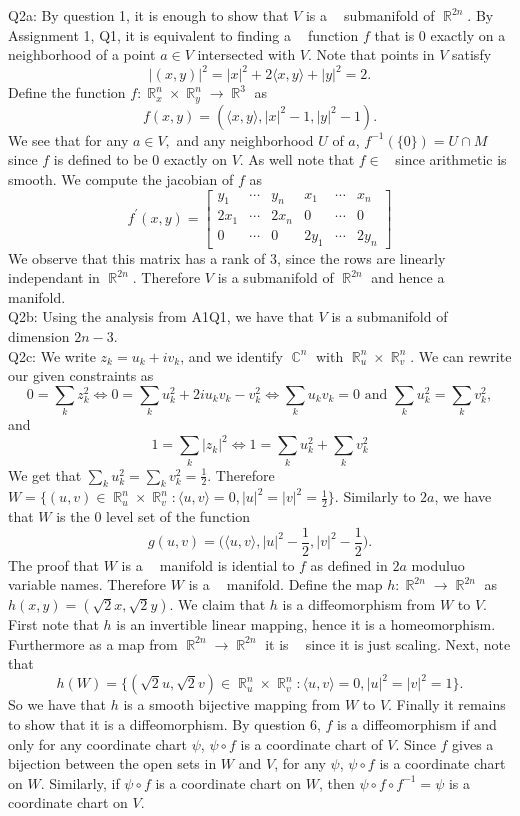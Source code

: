 \documentclass[letterpaper]{article}
\DeclareMathOperator{\smooth}{\mathcal{C}^\infty}
\DeclareMathOperator{\R}{\mathbb{R}}
\DeclareMathOperator{\C}{\mathbb{C}}
\newcommand{\lan}{\langle}
\newcommand{\ran}{\rangle}
\newcommand{\inn}[1]{\lan#1\ran}
\begin{document}
 
\noindent Q2a: By question 1, it is enough to show that $V$ is a $\smooth$ submanifold of $\R^{2n}$.
By Assignment 1, Q1, it is equivalent to finding a $\smooth$ function $f$ that is $0$ exactly on a neighborhood of a point $a\in V$ intersected with $V$.  
Note that points in $V$ satisfy $$|(x,y)|^2 = |x|^2 + 2\inn{x,y} + |y|^2 = 2.$$
Define the function $f: \R_x^n \times \R^n_y \to \R^3$ as $$f(x,y) = (\inn{x,y}, |x|^2-1, |y|^2-1).$$ 
We see that for any $a\in V,$ and any neighborhood $U$ of $a$, $f^{-1}(\{0\}) = U \cap M$ 
since $f$ is defined to be $0$ exactly on $V$. As well note that $f\in \smooth$ since arithmetic is smooth. 
We compute the jacobian of $f$ as 
$$f^\prime (x,y)= \begin{bmatrix}
    y_1 & \cdots & y_n & x_1 & \cdots & x_n 
    \\ 2x_1 & \cdots & 2x_n & 0 & \cdots & 0
    \\ 0 & \cdots & 0 & 2y_1 &\cdots & 2y_n 
\end{bmatrix} $$ We observe that this matrix has a rank of $3$, since the rows are linearly independant in $\R^{2n}$.
Therefore $V$ is a submanifold of $\R^{2n}$ and hence a $\smooth$ manifold. 
\newline \\ Q2b: Using the analysis from A1Q1, we have that $V$ is a submanifold of dimension $2n-3$. 
\newline \\ Q2c: We write $z_k = u_k + iv_k$, and we identify $\C^n $ with $\R_u^{n} \times \R^{n}_v$.
We can rewrite our given constraints as $$ 0=  \sum_k z_k^2 \iff 0 = \sum_{k} u_k^2 + 2iu_k v_k -v_k^2 \iff \sum_k u_kv_k =0 \text{ and } \sum_{k}u_k^2 = \sum_k v_k^2, $$ 
and $$1= \sum_{k} |z_k|^2 \iff 1 = \sum_k u_k^2 + \sum_k v_k^2 $$ 
We get that $\sum_k u_k^2 = \sum_{k} v_k^2 = \frac{1}{2}$. Therefore $W = \{(u,v) \in \R_u^{n} \times \R_v^n: \inn{u,v} = 0, |u|^2 = |v|^2 = \frac{1}{2}  \}.$ 
Similarly to $2a$, we have that $W$ is the $0$ level set of the function $$g(u,v) = \Big(\inn{u,v}, |u|^2 - \frac{1}{2}, |v|^2 - \frac{1}{2} \Big).$$
The proof that $W$ is a $\smooth$ manifold is idential to $f$ as defined in $2a$ moduluo variable names. 
Therefore $W$ is a $\smooth$ manifold. Define the map $h:\R^{2n} \to \R^{2n} $ as $h(x,y) = (\sqrt{2}x, \sqrt{2}y)$. 
We claim that $h$ is a diffeomorphism from $W$ to $V$. First note that $h$ is an invertible linear mapping, hence it is a homeomorphism. 
Furthermore as a map from $\R^{2n} \to \R^{2n}$ it is $\smooth$ since it is just scaling. 
Next, note that $$h(W) = \{(\sqrt{2}u,\sqrt{2}v) \in \R_u^{n} \times \R_v^{n} : \inn{u,v}= 0, |u|^2= |v|^2 =1\}.$$ 
So we have that $h$ is a smooth bijective mapping from $W$ to $V$. Finally it remains to show that it is a diffeomorphism.
By question $6$, $f$ is a diffeomorphism if and only for any coordinate chart $\psi$, $\psi\circ f$ is a coordinate chart of $V$. 
Since $f$ gives a bijection between the open sets in $W$ and $V$, for any $\psi$, $\psi\circ f$ is a coordinate chart on $W$. Similarly, if $\psi \circ f$ is a coordinate chart on $W$, 
then $\psi \circ f \circ f^{-1} = \psi$ is a coordinate chart on $V$. 
\end{document}
